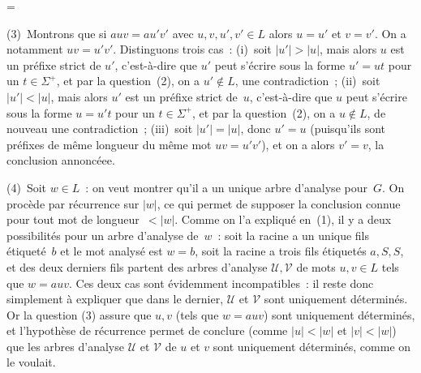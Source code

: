 \documentclass[12pt,a4paper]{article}
\theoremstyle{definition}
\newif\ifcorrige
\newenvironment{corrige}%
{\ifcorrige\relax\else\setbox0=\vbox\bgroup\fi%
\smallbreak\footnotesize\noindent{\underbar{\textit{Corrigé.}}\quad}}
{{\hbox{}\nobreak\hfill\checkmark}%
\ifcorrige\relax\else\egroup\fi\par}
\begin{document}
\begin{corrige}
\smallbreak

(3) Montrons que si $auv = au'v'$ avec $u,v,u',v'\in L$ alors $u=u'$
et $v=v'$.  On a notamment $uv = u'v'$.  Distinguons trois cas :
(i) soit $|u'|>|u|$, mais alors $u$ est un préfixe strict de $u'$,
c'est-à-dire que $u'$ peut s'écrire sous la forme $u' = ut$ pour un
$t\in \Sigma^+$, et par la question (2), on a $u'\not\in L$, une
contradiction ; (ii) soit $|u'|<|u|$, mais alors $u'$ est un préfixe
strict de $u$, c'est-à-dire que $u$ peut s'écrire sous la forme $u =
u't$ pour un $t\in\Sigma^+$, et par la question (2), on a $u\not\in
L$, de nouveau une contradiction ; (iii) soit $|u'|=|u|$, donc $u'=u$
(puisqu'ils sont préfixes de même longueur du même mot $uv = u'v'$),
et on a alors $v' = v$, la conclusion annoncéee.

\smallbreak

(4) Soit $w \in L$ : on veut montrer qu'il a un unique arbre d'analyse
pour $G$.  On procède par récurrence sur $|w|$, ce qui permet de
supposer la conclusion connue pour tout mot de longueur $<|w|$.  Comme
on l'a expliqué en (1), il y a deux possibilités pour un arbre
d'analyse de $w$ : soit la racine a un unique fils étiqueté $b$ et le
mot analysé est $w=b$, soit la racine a trois fils étiquetés $a,S,S$,
et des deux derniers fils partent des arbres d'analyse
$\mathscr{U},\mathscr{V}$ de mots $u,v\in L$ tels que $w=auv$.  Ces
deux cas sont évidemment incompatibles : il reste donc simplement à
expliquer que dans le dernier, $\mathscr{U}$ et $\mathscr{V}$ sont
uniquement déterminés.  Or la question (3) assure que $u,v$ (tels que
$w=auv$) sont uniquement déterminés, et l'hypothèse de récurrence
permet de conclure (comme $|u|<|w|$ et $|v|<|w|$) que les arbres
d'analyse $\mathscr{U}$ et $\mathscr{V}$ de $u$ et $v$ sont uniquement
déterminés, comme on le voulait.

\smallbreak


\end{corrige}
\end{document}
